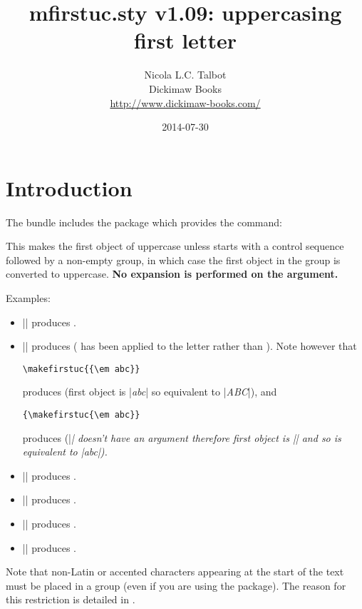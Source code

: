 \documentclass{nlctdoc}
\begin{document}
 \title{mfirstuc.sty v1.09: 
uppercasing first letter}
 \author{Nicola L.C. Talbot\\[10pt]
Dickimaw Books\\
\url{http://www.dickimaw-books.com/}}

 \date{2014-07-30}
 \maketitle
 \tableofcontents

 \section{Introduction}
 \label{sec:intro}

The  bundle includes the package 
 which provides the command:
\begin{definition}[\DescribeMacro{\makefirstuc}]
\end{definition}
This makes the first object of
 uppercase unless  starts with a control
sequence followed by a non-empty group, in which case the first
object in the group is converted to uppercase.
\textbf{No expansion is performed on the argument.}

Examples:
\begin{itemize}
\item || produces .

\item || produces 
( has been applied to the letter  rather
than ). Note however that
\begin{verbatim}
\makefirstuc{{\em abc}}
\end{verbatim}
produces  (first object is |{\em abc}| so
equivalent to |\MakeUppercase{\em abc}|), and
\begin{verbatim}
{\makefirstuc{\em abc}}
\end{verbatim}
produces {} (|\em| doesn't have an argument
therefore first object is |\em| and so is equivalent to
|{\MakeUppercase{\em}abc}|).

\item || produces .

\item || produces .

\item || produces .

\item || produces .

\end{itemize}
Note that non-Latin or accented characters appearing at the
start of the text must be placed in a group (even if you are
using the  package). The reason for this restriction
is detailed in .
\end{document}

